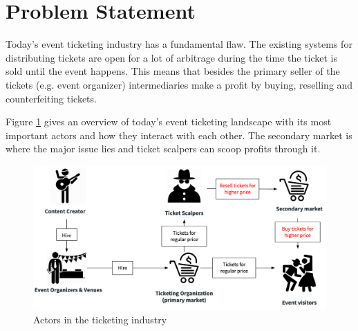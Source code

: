\section{Problem Statement}\label{sec:problem-statement}
Today's event ticketing industry has a fundamental flaw. The existing systems for distributing tickets are open for a lot of arbitrage during the time the ticket is sold until the event happens. This means that besides the primary seller of the tickets (e.g. event organizer) intermediaries make a profit by buying, reselling and counterfeiting tickets. 

Figure \ref{fig:ticketing-industry-landscape} gives an overview of today's event ticketing landscape with its most important actors and how they interact with each other. The secondary market is where the major issue lies and ticket scalpers can scoop profits through it.

\begin{figure}[H]
    \centering
    \includegraphics[width=16cm]{figures/ticketing-industry-landscape.png}
    \caption{Actors in the ticketing industry}
    \label{fig:ticketing-industry-landscape}
\end{figure}
